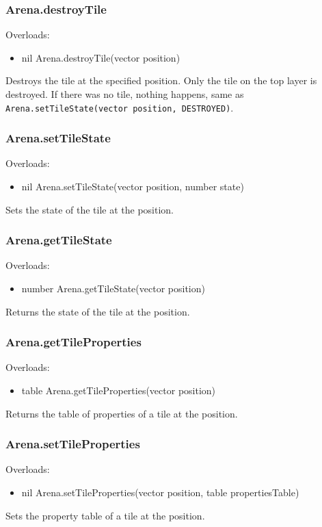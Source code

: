 \documentclass{book}
\newenvironment{ulist}
	{\begin{itemize}
			\itemsep0em}
	{\end{itemize}}
\begin{document}
\subsubsection{Arena.destroyTile}
Overloads:
\begin{ulist}
	\item nil Arena.destroyTile(vector position)
\end{ulist}
Destroys the tile at the specified position. Only the tile on the top layer is destroyed. If there was no tile, nothing happens, same as \texttt{Arena.setTileState(vector position, DESTROYED)}.

\subsubsection{Arena.setTileState}
Overloads:
\begin{ulist}
	\item nil Arena.setTileState(vector position, number state)
\end{ulist}
Sets the state of the tile at the position.

\subsubsection{Arena.getTileState}
Overloads:
\begin{ulist}
	\item number Arena.getTileState(vector position)
\end{ulist}
Returns the state of the tile at the position.

\subsubsection{Arena.getTileProperties}
Overloads:
\begin{ulist}
	\item table Arena.getTileProperties(vector position)
\end{ulist}
Returns the table of properties of a tile at the position.

\subsubsection{Arena.setTileProperties}
Overloads:
\begin{ulist}
	\item nil Arena.setTileProperties(vector position, table propertiesTable)
\end{ulist}
Sets the property table of a tile at the position.
\end{document}
